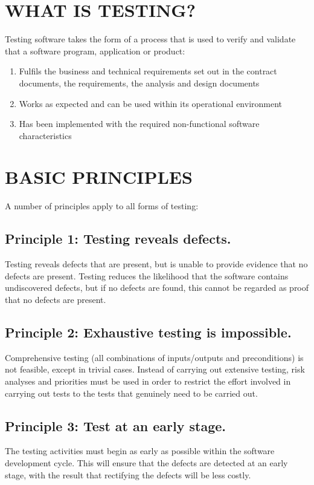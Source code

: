 \documentclass[12pt]{article}
\begin{document}
\section{WHAT IS TESTING?}
Testing software takes the form of a process that is used to verify and validate that a software program, application or product: 
\begin{enumerate}
	\item Fulfils the business and technical requirements set out in the contract documents, the requirements, the analysis and design documents
	\item Works as expected and can be used within its operational environment  
	\item Has been implemented with the required non-functional software characteristics 	
\end{enumerate}

\section{BASIC PRINCIPLES}
A number of principles apply to all forms of testing: \newline
 \subsection{Principle 1: Testing reveals defects.}
Testing reveals defects that are present, but is unable to provide evidence that no defects are present. Testing reduces the likelihood that the software contains undiscovered defects, but if no defects are found, this cannot be regarded as proof that no defects are present. \newline
 \subsection{Principle 2: Exhaustive testing is impossible.}
Comprehensive  testing  (all  combinations  of  inputs/outputs  and  preconditions)  is  not feasible, except in trivial cases. Instead of carrying out extensive testing, risk analyses and priorities must be used in  order to  restrict the effort involved in  carrying out  tests to the tests that genuinely need to be carried out.  \newline
 \subsection{Principle 3: Test at an early stage. }
The  testing  activities  must  begin  as  early  as  possible  within  the  software  development cycle. This will ensure that the defects are detected at an early stage, with the result that rectifying the defects will be less costly. \newline
\end{document}
